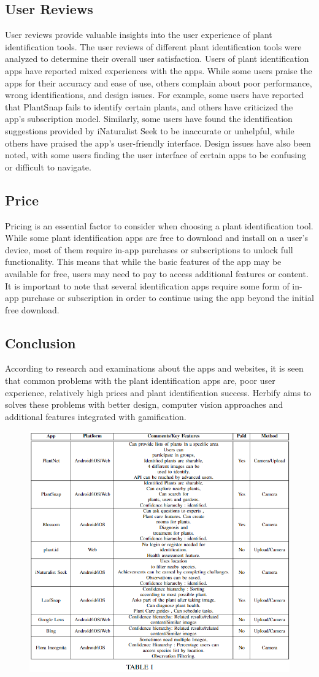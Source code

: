 \documentclass[conference]{IEEEtran}
\begin{document}
\subsection{User Reviews}
User reviews provide valuable insights into the user experience of plant identification tools.
The user reviews of different plant identification tools were analyzed to determine their overall user satisfaction.
Users of plant identification apps have reported mixed experiences with the apps. While some users praise the apps for their accuracy and ease of use, others complain about poor performance, wrong identifications, and design issues. For example, some users have reported that PlantSnap fails to identify certain plants, and others have criticized the app's subscription model. Similarly, some users have found the identification suggestions provided by iNaturalist Seek to be inaccurate or unhelpful, while others have praised the app's user-friendly interface. Design issues have also been noted, with some users finding the user interface of certain apps to be confusing or difficult to navigate.
\subsection{Price}
Pricing is an essential factor to consider when choosing a plant identification tool.
While some plant identification apps are free to download and install on a user's device, most of them require in-app purchases or subscriptions to unlock full functionality. This means that while the basic features of the app may be available for free, users may need to pay to access additional features or content. It is important to note that several identification apps require some form of in-app purchase or subscription in order to continue using the app beyond the initial free download.
\newline 
\subsection{Conclusion}
According to research and examinations about the apps and websites, it is seen that  common problems with the plant identification apps are, poor user experience, relatively high  prices and plant identification success. Herbify aims to solves these problems with better design, computer vision approaches and additional features integrated with gamification.


\begin{figure}[H]
\centerline{\includegraphics[width=0.48 \textwidth]{images/table1.png}}
\end{figure}
\end{document}
